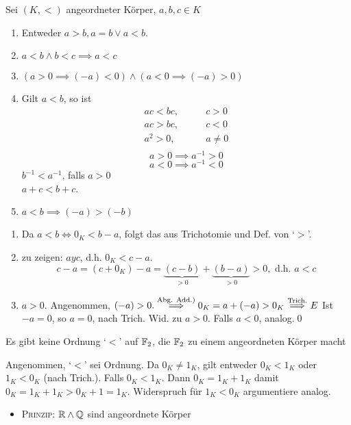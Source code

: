 \begin{sublemma}
	Sei $ ( K, < ) $ angeordneter Körper, $ a, b, c \in K $
	\begin{enumerate}[label=(\roman*)]
		\item Entweder $ a > b, a = b \vee a < b $.
		\item $ a < b \wedge b < c \implies a < c $
		\item $ ( a > 0 \implies (-a) < 0) \wedge ( a < 0 \implies (-a) > 0) $
		\item Gilt $ a < b $, so ist
			\begin{align*}
				ac < bc, & \qquad c>0\\
				ac > bc, & \qquad c < 0\\
				a^2 > 0, & \qquad a \neq 0\\
			\end{align*}
			\[ a > 0 \implies a^{-1} > 0 \]
			\[ a < 0 \implies a^{-1} < 0 \]
			$ b^{-1} < a^{-1} $, falls $ a > 0 $\\
			$ a + c < b + c $.
		\item $ a < b \implies (-a) > (-b) $
	\end{enumerate}
	\begin{subproof*}[(i)-(iii)]
		\begin{enumerate}[label=(\roman*)]
			\item Da $ a < b \iff 0_K < b - a $, folgt das aus Trichotomie und Def. von `$>$'.
			\item zu zeigen: $ a y c $, d.h. $ 0_K < c-a$.
				\[ c - a = ( c + 0_K ) - a = \underbrace{(c-b)}_{>0} + \underbrace{(b-a)}_{>0} > 0, \text{ d.h. } a < c \]
			\item $ a > 0 $. Angenommen, $ (-a ) > 0. \overset{\text{Abg. Add.)}}{\implies} 0_K = a + (-a) > 0_K \overset{\text{Trich.}}{\implies} \Lightning $ Ist $-a = 0$, so $ a = 0 $, nach Trich. Wid. zu $ a > 0 $. Falls $ a < 0 $, analog.\qed
		\end{enumerate}
	\end{subproof*}
\end{sublemma}
\begin{subcorollary}
	Es gibt keine Ordnung `$<$' auf $\mathbb{F}_2$, die $\mathbb{F}_2$ zu einem angeordneten Körper macht
	\begin{proof*}
		Angenommen, `$<$' sei Ordnung. Da $ 0_K \neq 1_K $, gilt entweder $ 0_K < 1_K $ oder $ 1_K < 0_K $ (nach Trich.). Falls $ 0_K < 1_K $. Dann $ 0_K = 1_K + 1_K $ damit $ 0_K = 1_K + 1_K > 0_K + 1 = 1_K $. Widerspruch für $1_K < 0_K$ argumentiere analog.
	\end{proof*}
\end{subcorollary}
\begin{itemize}
	\item \textsc{Prinzip:} $\mathbb{R} \wedge \mathbb{Q} $ sind angeordnete Körper
\end{itemize}

